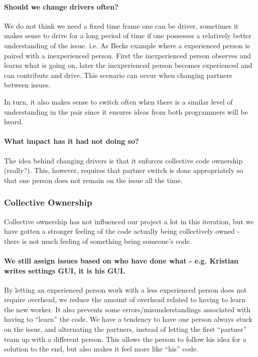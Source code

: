 \paragraph{Should we change drivers often?}
We do not think we need a fixed time frame one can be driver, sometimes it makes sense to drive for a long period of time if one possesses a relatively better understanding of the issue. 
i.e. As Becks example where a experienced person is paired with a inexperienced person. First the inexperienced person observes and learns what is going on, later the inexperienced person becomes experienced and can contribute and drive. This scenario can occur when changing partners between issues. 

In turn, it also makes sense to switch often when there is a similar level of understanding in the pair since it ensures ideas from both programmers will be heard.


\paragraph{What impact has it had not doing so?}
The idea behind changing drivers is that it enforces collective code ownership (really?). This, however, requires that partner switch is done appropriately so that one person does not remain on the issue all the time.

\subsubsection{Collective Ownership}
Collective ownership has not influenced our project a lot in this iteration, but we have gotten a stronger feeling of the code actually being collectively owned - there is not much feeling of something being someone’s code.

\paragraph{We still assign issues based on who have done what - e.g. Kristian writes settings GUI, it is his GUI.}
By letting an experienced person work with a less experienced person does not require overhead, we reduce the amount of overhead related to having to learn the new worker. It also prevents some errors/misunderstandings associated with having to “learn” the code.
We have a tendency to have one person always stuck on the issue, and alternating the partners, instead of letting the first “partner” team up with a different person. This allows the person to follow his idea for a solution to the end, but also makes it feel more like “his” code.


